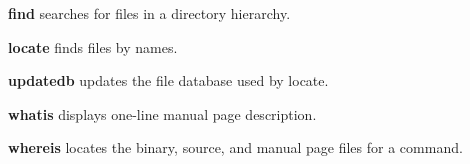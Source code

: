 \begin{enumx}
\item [\cmd] \textbf{find} searches for files in a directory hierarchy.
\item [\cmd] \textbf{locate} finds files by names.
\item [\cmd] \textbf{updatedb} updates the file database used by locate.
\item [\cmd] \textbf{whatis} displays one-line manual page description.
\item [\cmd] \textbf{whereis} locates the binary, source, 
and manual page files for a command.
\end{enumx}
